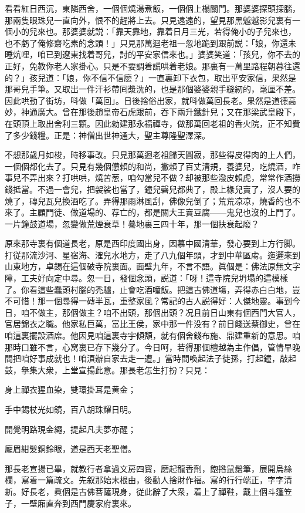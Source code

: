 看看紅日西沉，東隣西舍，一個個燒湯煮飯，一個個上榻關門。那婆婆探頭探腦，那兩隻眼珠兒一直向外，恨不的趕將上去。只見遠遠的，望見那黑魆魆影兒裏有一個小的兒來也。那婆婆就説：「靠天靠地，靠着日月三光，若得俺小的子兒來也，也不虧了俺修齋吃素的念頭！」只見那萬迴老祖一忽地跪到跟前説：「娘，你還未睡炕哩，咱已到遼東找着哥兒，討的平安家信來也。」婆婆笑道：「孩兒，你不去的正好，免教你老人家掛心。只是不要調着謊哄着老娘。那裏有一萬里路程朝暮往還的？」孩兒道：「娘，你不信不信麽？」一直裏卸下衣包，取出平安家信，果然是那哥兒手筆。又取出一件汗衫帶囘漿洗的，也是那個婆婆親手縫紉的，毫厘不差。因此哄動了街坊，呌做「萬回」。日後捨俗出家，就呌做萬回長老。果然是道德高妙，神通廣大。曾在那後趙皇帝石虎跟前，吞下兩升鐵針兒；又在那梁武皇殿下，在頭頂上取出舍利三顆。因此勑建那永福禪寺，做那萬回老祖的香火院，正不知費了多少錢糧。正是：神僧出世神通大，聖主尊隆聖澤深。

不想那歲月如梭，時移事改。只見那萬迴老祖歸天圓寂，那些得皮得肉的上人們，一個個都化去了。只見有幾個憊賴的和尚，撇賴了百丈清規，養婆兒，吃燒酒，咋事兒不弄出來？打哄哄，燒苦葱，咱勾當兒不做？却被那些潑皮賴虎，常常作酒撈錢抵當。不過一會兒，把袈裟也當了，鐘兒磬兒都典了，殿上椽兒賣了，沒人要的燒了，磚兒瓦兒換酒吃了。弄得那雨淋風刮，佛像兒倒了；荒荒凉凉，燒香的也不來了。主顧門徒、做道場的、荐亡的，都是關大王賣豆腐——鬼兒也沒的上門了。一片鐘鼓道場，忽變做荒煙衰草！驀地裏三四十年，那一個扶衰起廢？

原來那寺裏有個道長老，原是西印度國出身，因慕中國清華，發心要到上方行脚。打従那流沙河、星宿海、㴶兒水地方，走了八九個年頭，才到中華區䖏。迤邐來到山東地方，卓錫在這個破寺院裏面。面壁九年，不言不語。眞個是：佛法原無文字障，工夫好向定中尋。忽一日，發個念頭，説道：「呀！這寺院兒坍塌的這模樣了。你看這些蠢頭村腦的禿驢，止會吃酒噇飯。把這古佛道塲，弄得赤白白地，豈不可惜！那一個尋得一磚半瓦，重整家風？常記的古人説得好：人傑地靈。事到今日，咱不做主，那個做主？咱不出頭，那個出頭？况且前日山東有個西門大官人，官居錦衣之職。他家私巨萬，富比王侯，家中那一件没有？前日餞送蔡御史，曾在咱這裏擺設酒席。他因見咱這裏寺宇傾頽，就有個舍錢布施、鼎建重新的意思。咱那時口雖不言，心窝裏已存下幾分了。今日呵，若得那個檀越為主作倡，管情早晚間把咱好事成就也！咱湏辦自家去走一遭。」當時間喚起法子徒孫，打起鐘，敲起鼓，擧集大衆，上堂宣揚此意。那長老怎生打扮？只見：

身上禪衣猩血染，雙環掛耳是黄金；

手中錫杖光如鏡，百八胡珠耀日明。

開覺明路現金繩，提起凡夫夢亦醒；

龐眉紺髮銅鈴眼，道是西天老聖僧。

那長老宣揚已畢，就教行者拿過文房四寳，磨起龍香劑，飽揝鼠鬚筆，展開烏絲欄，寫着一篇疏文。先叙那始末根由，後勸人捨財作福。寫的行行端正，字字清新。好長老，眞個是古佛菩薩現身，従此辭了大衆，着上了禪鞋，戴上個斗篷笠子，一壁廂直奔到西門慶家府裏來。

